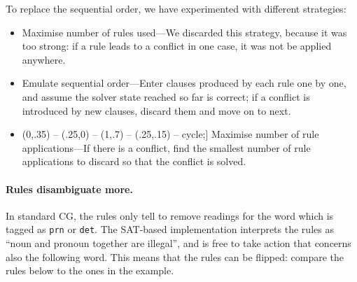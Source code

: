 \documentclass[11pt]{article}
\def\checkmark{\tikz\fill[scale=0.4](0,.35) -- (.25,0) -- (1,.7) -- (.25,.15) -- cycle;}
\begin{document}

To replace the sequential order, we have experimented with different strategies:
\begin{itemize}
\item Maximise number of rules used---We discarded this strategy, because it was too strong: if a rule leads to a conflict in one case, it was not be applied anywhere.
\item Emulate sequential order---Enter clauses produced by each rule one by one, and assume the solver state reached so far is correct; if a conflict is introduced by new clauses, discard them and move on to next.
\item [\checkmark] Maximise number of rule applications---If there is a conflict, find the smallest number of rule applications to discard so that the conflict is solved.
\end{itemize}



\paragraph{Rules disambiguate more.}
In standard CG, the rules only tell to remove readings for the word which is tagged as 
\texttt{prn} or \texttt{det}. The SAT-based implementation interprets the rules as ``noun and pronoun together are illegal'', and is free to take action that concerns also the following word.
This means that the rules can be flipped: compare the rules below to the ones in the example.
\end{document}
